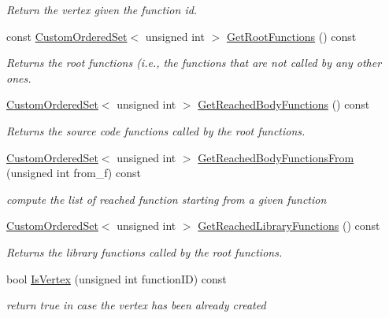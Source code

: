 \begin{DoxyCompactItemize}
\begin{DoxyCompactList}\small\item\em Return the vertex given the function id. \end{DoxyCompactList}\item 
const \hyperlink{classCustomOrderedSet}{Custom\+Ordered\+Set}$<$ unsigned int $>$ \hyperlink{classCallGraphManager_aa915f9088c122e681f0f477eb15e4905}{Get\+Root\+Functions} () const
\begin{DoxyCompactList}\small\item\em Returns the root functions (i.\+e., the functions that are not called by any other ones. \end{DoxyCompactList}\item 
\hyperlink{classCustomOrderedSet}{Custom\+Ordered\+Set}$<$ unsigned int $>$ \hyperlink{classCallGraphManager_a12c4d7b31674d81c02d0b4bf3150433f}{Get\+Reached\+Body\+Functions} () const
\begin{DoxyCompactList}\small\item\em Returns the source code functions called by the root functions. \end{DoxyCompactList}\item 
\hyperlink{classCustomOrderedSet}{Custom\+Ordered\+Set}$<$ unsigned int $>$ \hyperlink{classCallGraphManager_ada5792c79efd5eb5646ee1f3fe6651f7}{Get\+Reached\+Body\+Functions\+From} (unsigned int from\+\_\+f) const
\begin{DoxyCompactList}\small\item\em compute the list of reached function starting from a given function \end{DoxyCompactList}\item 
\hyperlink{classCustomOrderedSet}{Custom\+Ordered\+Set}$<$ unsigned int $>$ \hyperlink{classCallGraphManager_a111b6fd3a5ff50d0fe9ffbbea17f4ea5}{Get\+Reached\+Library\+Functions} () const
\begin{DoxyCompactList}\small\item\em Returns the library functions called by the root functions. \end{DoxyCompactList}\item 
bool \hyperlink{classCallGraphManager_af8ff924d2289789505467f6641620f9e}{Is\+Vertex} (unsigned int function\+ID) const
\begin{DoxyCompactList}\small\item\em return true in case the vertex has been already created \end{DoxyCompactList}\item 

\end{DoxyCompactItemize}
